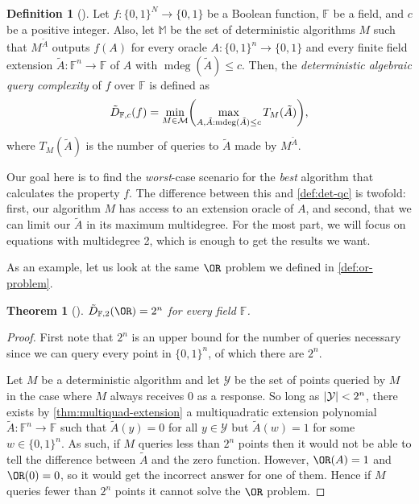 \documentclass[english,12pt]{reedthesis}
\theoremstyle{plain}
\newtheorem{thm}{Theorem}[section]
\theoremstyle{definition}
\newtheorem{defn}[defn]{Definition}
\theoremstyle{remark}
\DeclareMathOperator{\mdeg}{mdeg}
\DeclarePairedDelimiter{\abs}{\lvert}{\rvert}
\begin{document}
\begin{defn}[{\cite[Def. 4.1]{AW09}}]\label{def:aqc}
  Let $f\colon \{0, 1\}^{N} \rightarrow \{0, 1\}$ be a Boolean function, $\mathbb{F}$ be a
  field, and $c$ be a positive integer. Also, let $\mathbb{M}$ be the set of
  deterministic algorithms $M$ such that $M^{\tilde{A}}$ outputs $f(A)$ for
  every oracle $A\colon \{0, 1\}^{n} \rightarrow \{0, 1\}$ and every finite field
  extension $\tilde{A}\colon \mathbb{F}^{n} \rightarrow \mathbb{F}$ of $A$ with
  $\mdeg(\tilde{A}) \le c$. Then, the \emph{deterministic algebraic query
    complexity} of $f$ over $\mathbb{F}$ is defined as
  \begin{equation}
    \tilde{D}_{\mathbb{F}, c}(f) = \min_{M \in \mathcal{M}}\mleft(
      \max_{A, \tilde{A}: \mdeg(\tilde{A}) \le c}T_{M}(\tilde{A})
    \mright),
  \end{equation}
  where $T_{M}(\tilde{A})$ is the number of queries to $\tilde{A}$ made by
  $M^{\tilde{A}}$.
\end{defn}

Our goal here is to find the \emph{worst}-case scenario for the \emph{best}
algorithm that calculates the property $f$. The difference between this and
\cref{def:det-qc} is twofold: first, our algorithm $M$ has access to
an extension oracle of $A$, and second, that we can limit our $\tilde{A}$ in
its maximum multidegree. For the most part, we will focus on equations with
multidegree 2, which is enough to get the results we want.

As an example, let us look at the same $\OR$ problem we defined in
\cref{def:or-problem}.

\begin{thm}[{\cite[Thm.\ 4.4]{AW09}}]\label{thm:or-algebraic}
  $\tilde{D}_{\mathbb{F},2}(\OR) = 2^{n}$ for every field $\mathbb{F}$.
\end{thm}

\begin{proof}
  First note that $2^{n}$ is an upper bound for the number of queries necessary
  since we can query every point in $\{0, 1\}^{n}$, of which there are $2^{n}$.

  Let $M$ be a deterministic algorithm and let $\mathcal{Y}$ be the set of points queried
  by $M$ in the case where $M$ always receives $0$ as a response. So long as
  $\abs{\mathcal{Y}} < 2^{n}$, there exists by \cref{thm:multiquad-extension} a
  multiquadratic extension polynomial
  $\tilde{A}\colon \mathbb{F}^{n} \rightarrow \mathbb{F}$ such that $\tilde{A}(y) = 0$ for
  all $y \in \mathcal{Y}$ but $\tilde{A}(w) = 1$ for some $w \in \{0, 1\}^{n}$. As such, if
  $M$ queries less than $2^{n}$ points then it would not be able to tell the
  difference between $\tilde{A}$ and the zero function. However, $\OR(A) = 1$
  and $\OR(0) = 0$, so it would get the incorrect answer for one of them. Hence
  if $M$ queries fewer than $2^{n}$ points it cannot solve the $\OR$ problem.
\end{proof}
\end{document}
